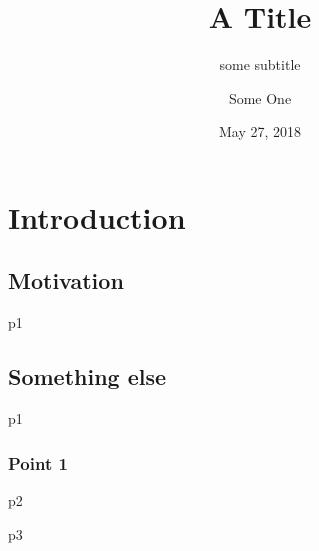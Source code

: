 \documentclass[9pt, notes]{beamer}
\title{A Title}
\subtitle{some subtitle}
\author{Some One}%
\institute{Some Where \\ Department }
\date{May 27, 2018}
\begin{document}
\begin{frame}[plain]
  \titlepage
\end{frame}

\section{Introduction}

\subsection{Motivation}
\begin{frame}
  p1
\end{frame}

\subsection{Something else}
\begin{frame}
  p1
\end{frame}


\subsubsection{Point 1}
\begin{frame}
  p2
\end{frame}
\begin{frame}
  p3
\end{frame}
\end{document}
